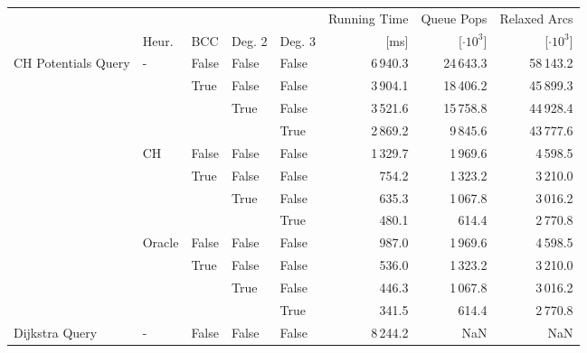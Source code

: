 \begin{tabular}{lllllrrr}
\toprule
 & & & & & Running Time &     Queue Pops &   Relaxed Arcs \\
 & Heur. & BCC & Deg. 2 & Deg. 3 &         [ms] & [$\cdot 10^3$] & [$\cdot 10^3$] \\
\midrule
CH Potentials Query & - & False & False & False &           6\,940.3 &         24\,643.3 &           58\,143.2 \\
               &   & True  & False & False &           3\,904.1 &         18\,406.2 &           45\,899.3 \\
               &   &       & True  & False &           3\,521.6 &         15\,758.8 &           44\,928.4 \\
               &   &       &       & True  &           2\,869.2 &          9\,845.6 &           43\,777.6 \\
               & CH & False & False & False &           1\,329.7 &          1\,969.6 &            4\,598.5 \\
               &   & True  & False & False &            754.2 &          1\,323.2 &            3\,210.0 \\
               &   &       & True  & False &            635.3 &          1\,067.8 &            3\,016.2 \\
               &   &       &       & True  &            480.1 &           614.4 &            2\,770.8 \\
               & Oracle & False & False & False &            987.0 &          1\,969.6 &            4\,598.5 \\
               &   & True  & False & False &            536.0 &          1\,323.2 &            3\,210.0 \\
               &   &       & True  & False &            446.3 &          1\,067.8 &            3\,016.2 \\
               &   &       &       & True  &            341.5 &           614.4 &            2\,770.8 \\
Dijkstra Query & - & False & False & False &           8\,244.2 &             NaN &               NaN \\
\bottomrule
\end{tabular}

